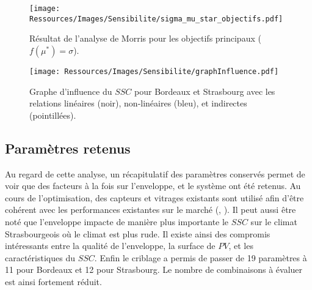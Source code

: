 \begin{figure}
    \centering
    \texttt{[image: Ressources/Images/Sensibilite/sigma\_mu\_star\_objectifs.pdf]}
    \caption{Résultat de l’analyse de Morris pour les objectifs principaux
             ($f(\mu^{*}) = \sigma$).}
    \label{fig:objectifs_mu_star}
\end{figure}


\begin{landscape}
    \begin{figure}
        \centering
        \texttt{[image: Ressources/Images/Sensibilite/graphInfluence.pdf]}
        \caption[Graphe d’influence du $SSC$ pour Bordeaux et Strasbourg]
                {Graphe d’influence du $SSC$ pour Bordeaux et Strasbourg avec les
                 relations linéaires (noir), non-linéaires (bleu), et indirectes (pointillées).}
        \label{fig:graphe_influence_objectifs}
    \end{figure}
\end{landscape}



\subsection{Paramètres retenus} %
\label{sub:parametres_retenus}
Au regard de cette analyse, un récapitulatif des paramètres conservés permet de voir que
des facteurs à la fois sur l’enveloppe, et le système ont été retenus. Au cours de
l’optimisation, des capteurs et vitrages existants sont utilisé afin d’être cohérent avec
les performances existantes sur le marché (,
). Il peut aussi être noté que l’enveloppe impacte de manière
plus importante le $SSC$ sur le climat Strasbourgeois où le climat est plus rude. Il
existe ainsi des compromis intéressants entre la qualité de l’enveloppe, la surface de
$PV$, et les caractéristiques du $SSC$. Enfin le criblage a permis de passer de
\num{19} paramètres à \num{11} pour Bordeaux et \num{12} pour Strasbourg. Le
nombre de combinaisons à évaluer est ainsi fortement réduit.


